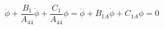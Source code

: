 \begin{equation} \label{eq:roll_decay_nonedim_a44}
\ddot{\phi} + \frac{B_{1}}{A_{44}} \dot{\phi} + \frac{C_{1}}{A_{44}} \phi = 
\ddot{\phi} + B_{1A} \dot{\phi} + C_{1A} \phi = 0
\end{equation}